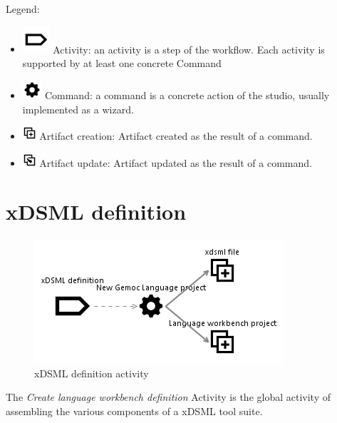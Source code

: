 \documentclass{gemoc} %
\begin{document}
Legend:
\begin{itemize}
	\item \includegraphics[width=1cm]{fig/step} Activity: an activity is a step of the workflow. Each activity is supported by at least one concrete Command
	\item \includegraphics[width=0.7cm]{fig/command} Command: a command is a concrete action of the studio, usually implemented as a wizard.
	\item \includegraphics[width=0.5cm]{fig/artifact_add} Artifact creation: Artifact created as the result of a command.
	\item \includegraphics[width=0.5cm]{fig/artifact_update} Artifact update:  Artifact updated as the result of a command.
\end{itemize}
\section{xDSML definition}
\label{sec:xDSML_definition}
\begin{figure}[h]
		\center
		\includegraphics*[trim=0.0cm 0.0cm 0cm 0.0cm, clip=true]{fig/xDSML_definition}
		\caption{xDSML definition activity}
		\label{fig:xDSML_definition}
\end{figure}

The \emph{Create language workbench definition} Activity is the global activity of assembling the various components of a xDSML tool suite.
\end{document}
